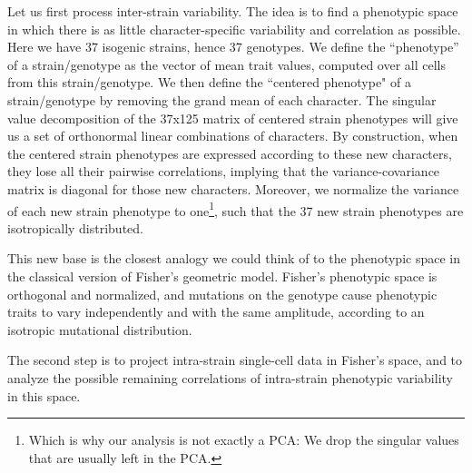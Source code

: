 Let us first process inter-strain variability. The idea is to find a phenotypic space in which there is as little character-specific variability and correlation as possible. Here we have 37 isogenic strains, hence 37 genotypes. We define the ``phenotype'' of a strain/genotype as the vector of mean trait values, computed over all cells from this strain/genotype. We then define the ``centered phenotype" of a strain/genotype by removing the grand mean of each character. The singular value decomposition of the 37x125 matrix of centered strain phenotypes will give us a set of orthonormal linear combinations of characters. By construction, when the centered strain phenotypes are expressed according to these new characters, they lose all their pairwise correlations, implying that the variance-covariance matrix is diagonal for those new characters. Moreover, we normalize the variance of each new strain phenotype to one\footnote{Which is why our analysis is not exactly a PCA: We drop the singular values that are usually left in the PCA.}, such that the 37 new strain phenotypes are isotropically distributed.

This new base is the closest analogy we could think of to the phenotypic space in the classical version of Fisher's geometric model. Fisher's phenotypic space is orthogonal and normalized, and mutations on the genotype cause phenotypic traits to vary independently and with the same amplitude, according to an isotropic mutational distribution.

The second step is to project intra-strain single-cell data in Fisher's space, and to analyze the possible remaining correlations of intra-strain phenotypic variability in this space.

